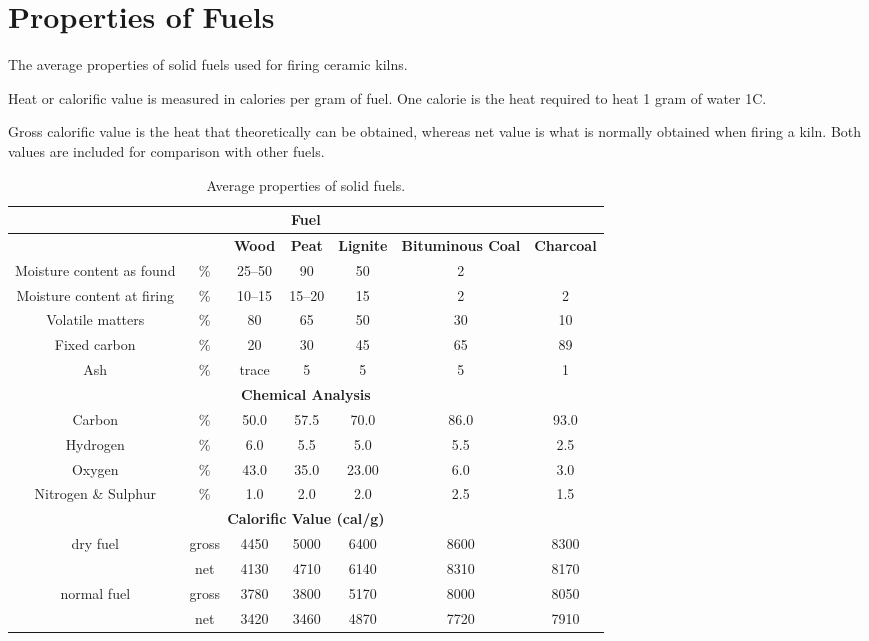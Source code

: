 \chapter{Properties of Fuels}
\label{propertiesoffuel}
The average properties of solid fuels used for firing ceramic kilns.

Heat or calorific value is measured in calories per gram of fuel. One calorie 
is the heat required to heat 1 gram of water 1\degree C.

Gross calorific value is the heat that theoretically can be obtained, whereas 
net value is what is normally obtained when firing a kiln. Both values are 
included for comparison with other fuels.
\begin{landscape}
  \begin{center}

    \begin{table}\centering
    \renewcommand{\arraystretch}{1.1}      
    \begin{tabular}{|c|c||c|c|c|c|c|}\hline
  \multicolumn{7}{|c|}{\textbf{Fuel}}\\\hline  
  &&\textbf{Wood}&\textbf{Peat}&\textbf{Lignite}&\textbf{Bituminous 
    Coal}&\textbf{Charcoal}\\\hline\hline
  Moisture content as found&\%&25--50&90&50&2&\\\hline
  Moisture content at firing&\%&10--15&15--20&15&2&2\\\hline
  Volatile matters&\%&80&65&50&30&10\\\hline
  Fixed carbon&\%&20&30&45&65&89\\\hline
  Ash&\%&trace&5&5&5&1\\\hline
  \multicolumn{7}{|c|}{\textbf{Chemical Analysis}}\\\hline
  Carbon&\%&50.0&57.5&70.0&86.0&93.0\\\hline
  Hydrogen&\%&6.0&5.5&5.0&5.5&2.5\\\hline
  Oxygen&\%&43.0&35.0&23.00&6.0&3.0\\\hline
  Nitrogen \& Sulphur&\%&1.0&2.0&2.0&2.5&1.5\\\hline
  \multicolumn{7}{|c|}{\textbf{Calorific Value (cal/g)}}\\\hline
  dry fuel&gross&4450&5000&6400&8600&8300\\\hline
  &net&4130&4710&6140&8310&8170\\\hline
  normal fuel&gross&3780&3800&5170&8000&8050\\\hline
  &net&3420&3460&4870&7720&7910\\\hline
\end{tabular}
\caption{Average properties of solid fuels.}
\label{tab:propertiesoffuelsolid}    \end{table}
  \end{center}
\end{landscape}
